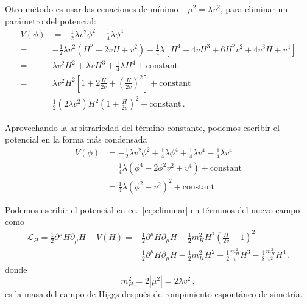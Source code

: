 \begin{frame}
Otro método es usar las ecuaciones de mínimo $-\mu^2=\lambda v^2$, para eliminar un parámetro del potencial:
\begin{align}
  \label{eq:eliminar}
  V(\phi)&=-\tfrac{1}{2}\lambda v^2\phi^2+\tfrac{1}{4}\lambda\phi^4\nonumber\\
  =&-\tfrac{1}{2}\lambda v^2 \left(H^2+2vH+v^2\right)+\tfrac{1}{4}\lambda\left[H^4+4vH^3+6H^2v^2+4v^3H+v^4\right]\nonumber\\
  =&\lambda v^2H^2+\lambda vH^3+\tfrac{1}{4}\lambda H^4+\text{constant} \nonumber\\
  =&\lambda v^2 H^2 \left[1 + 2\frac{H}{2v} + \left( \frac{H}{2v} \right)^2\right]+\text{constant} \nonumber\\
    =&\frac{1}{2}\left( 2\lambda v^2 \right) H^2 \left(1+\frac{H}{2v}\right)^2+\text{constant} \,.
\end{align}
\end{frame}

Aprovechando la arbitrariedad del término constante, podemos escribir el potencial en la forma más condensada
\begin{align}
  V(\phi)&=-\tfrac{1}{2}\lambda v^2\phi^2+\tfrac{1}{4}\lambda\phi^4+\tfrac{1}{4}\lambda v^4-\tfrac{1}{4}\lambda v^4\nonumber\\
  &=\tfrac{1}{4}\lambda \left(\phi^4-2 \phi^{2} v^2 +v^{4} \right)+\text{constant}\nonumber\\
    &=\tfrac{1}{4}\lambda \left(\phi^2-v^{2}\right)^{2}+\text{constant}\,.
\end{align}

\begin{frame}
Podemos escribir el potencial en ec.~\eqref{eq:eliminar} en términos del  nuevo campo como
\begin{align}
\label{eq:higgspot}
  \mathcal{L}_H=\tfrac{1}{2}\partial^\mu H\partial_\mu H- V(H)
  =&\frac{1}{2}\partial^\mu H\partial_\mu H
     -\frac{1}{2}m_H^2 H^2\left( \frac{H}{2v}+ 1 \right)^2\nonumber\\
  =&\frac{1}{2}\partial^\mu H\partial_\mu H-\frac{1}{2}m_H^2H^2-\frac{1}{2}\frac{m_H^2}{v}H^3-\frac{1}{8}\frac{m_H^2}{v^2} H^4 
\,.
\end{align}
donde
\begin{equation}
\label{eq:higgsmass}
  m_H^2=2\left|\mu^2\right|=2\lambda v^2\,,
\end{equation}
es la masa del campo de Higgs después de rompimiento espontáneo de simetría.
\end{frame}

